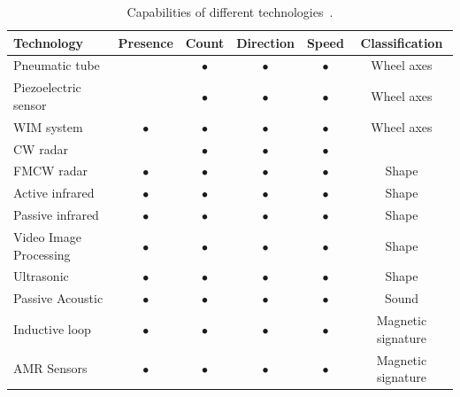 \begin{table}[!p]
\centering
\caption[Capabilities of different technologies]{Capabilities of different technologies~\cite{path2007}.}
\begin{tabular}{lccccc}\toprule
	\textbf{Technology} 	& \textbf{Presence} & \textbf{Count} & \textbf{Direction} & \textbf{Speed} & \textbf{Classification}\\\midrule
	Pneumatic tube		&		& $\bullet$	& $\bullet$	& $\bullet$	& Wheel axes\\
	Piezoelectric sensor	&		& $\bullet$	& $\bullet$	& $\bullet$	& Wheel axes\\
	WIM system		& $\bullet$	& $\bullet$	& $\bullet$	& $\bullet$	& Wheel axes\\
	CW radar		& 		& $\bullet$	& $\bullet$	& $\bullet$	& \\
	FMCW radar		& $\bullet$	& $\bullet$	& $\bullet$	& $\bullet$	& Shape\\
	Active infrared		& $\bullet$	& $\bullet$	& $\bullet$	& $\bullet$	& Shape\\
	Passive infrared	& $\bullet$	& $\bullet$	& $\bullet$	& $\bullet$	& Shape\\
	Video Image Processing 	& $\bullet$	& $\bullet$	& $\bullet$	& $\bullet$	& Shape\\
	Ultrasonic		& $\bullet$	& $\bullet$	& $\bullet$	& $\bullet$	& Shape\\
	Passive Acoustic	& $\bullet$	& $\bullet$	& $\bullet$	& $\bullet$	& Sound\\
	Inductive loop		& $\bullet$	& $\bullet$	& $\bullet$	& $\bullet$	& Magnetic signature\\ 
	AMR Sensors		& $\bullet$	& $\bullet$	& $\bullet$	& $\bullet$	& Magnetic signature\\ \bottomrule
\end{tabular} 
\label{tbl:techs}
\end{table} 

